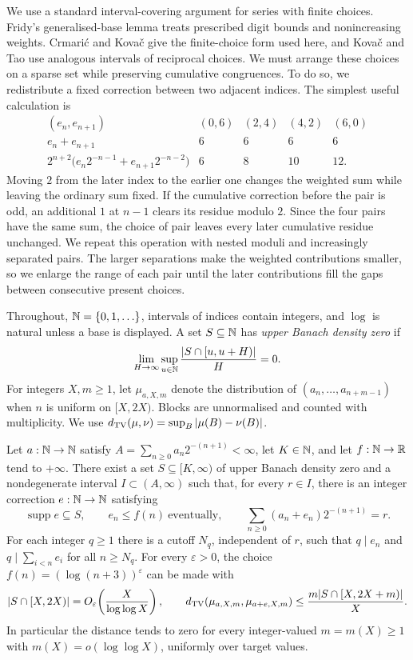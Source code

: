 \documentclass[11pt]{article}
\begin{document}
We use a standard interval-covering argument for series with finite choices.
Fridy's generalised-base lemma \cite[p.~194]{fridy1966} treats prescribed
digit bounds and nonincreasing weights.  Crmari\'{c} and Kova\v{c}
\cite[Lemma~4]{crmarickovac2025} give the finite-choice form used here,
and Kova\v{c} and Tao \cite[Lemma~5.1]{kovactao2024} use analogous
intervals of reciprocal choices.  We must arrange these choices on a sparse set while preserving cumulative
congruences.  To do so, we redistribute a fixed correction between two adjacent
indices.  The simplest useful calculation is
\[
 \begin{array}{c|rrrr}
 (e_n,e_{n+1}) &(0,6)&(2,4)&(4,2)&(6,0)\\
 e_n+e_{n+1} &6&6&6&6\\
 2^{n+2}\bigl(e_n2^{-n-1}+e_{n+1}2^{-n-2}\bigr)&6&8&10&12.
 \end{array}
\]
Moving $2$ from the later index to the earlier one changes the weighted
sum while leaving the ordinary sum fixed.  If the cumulative correction
before the pair is odd, an additional $1$ at $n-1$ clears its residue
modulo $2$.  Since the four pairs have the same sum, the choice of pair leaves every
later cumulative residue unchanged.  We repeat this operation with
nested moduli and increasingly separated pairs.  The larger separations
make the weighted contributions smaller, so we enlarge the range of each
pair until the later contributions fill the gaps between consecutive
present choices.

Throughout, $\mathbb{N}=\{0,1,\ldots\}$, intervals of indices contain integers,
and $\log$ is natural unless a base is displayed.  A set $S\subseteq\mathbb{N}$
has \emph{upper Banach density zero} if
\[
 \lim_{H\to\infty}\sup_{u\in\mathbb{N}}\frac{|S\cap[u,u+H)|}{H}=0.
\]
For integers $X,m\ge1$, let $\mu_{a,X,m}$ denote the distribution of
$(a_n,\ldots,a_{n+m-1})$ when $n$ is uniform on $[X,2X)$.  Blocks are
unnormalised and counted with multiplicity.  We use
$d_{\rm TV}(\mu,\nu)=\sup_B|\mu(B)-\nu(B)|$.

\begin{proposition}\label{res:sparserationalisation}
Let $a:\mathbb{N}\to\mathbb{N}$ satisfy $A=\sum_{n\ge0}a_n2^{-(n+1)}<\infty$,
let $K\in\mathbb{N}$, and let $f:\mathbb{N}\to\mathbb{R}$ tend to $+\infty$.
There exist a set $S\subseteq[K,\infty)$ of upper Banach density zero
and a nondegenerate interval $I\subset(A,\infty)$ such that, for every
$r\in I$, there is an integer correction $e:\mathbb{N}\to\mathbb{N}$ satisfying
\[
 \operatorname{supp}e\subseteq S,\qquad e_n\le f(n)\ \text{eventually},
 \qquad \sum_{n\ge0}(a_n+e_n)2^{-(n+1)}=r.
\]
For each integer $q\ge1$ there is a cutoff $N_q$, independent of $r$,
such that $q\mid e_n$ and $q\mid\sum_{i<n}e_i$ for all $n\ge N_q$.
For every $\varepsilon>0$, the choice $f(n)=(\log(n+3))^\varepsilon$
can be made with
\[
 |S\cap[X,2X)|=O_\varepsilon\!\left(\frac{X}{\log\log X}\right),
 \qquad
 d_{\rm TV}(\mu_{a,X,m},\mu_{a+e,X,m})
 \le\frac{m|S\cap[X,2X+m)|}{X}.
\]
In particular the distance tends to zero for every integer-valued
$m=m(X)\ge1$ with $m(X)=o(\log\log X)$, uniformly over target values.
\end{proposition}
\end{document}
